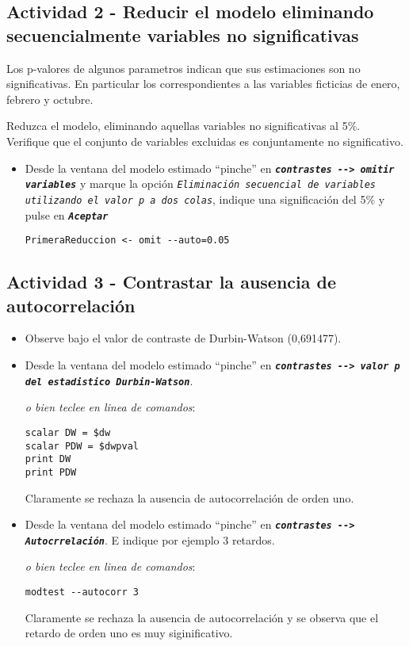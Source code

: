 \documentclass[11pt]{article}
\begin{document}
\subsection{Actividad 2 - Reducir el modelo eliminando secuencialmente variables no significativas}
\label{sec:org7359cb0}

Los p-valores de algunos parametros indican que sus estimaciones son
no significativas. En particular los correspondientes a las variables
ficticias de enero, febrero y octubre.

Reduzca el modelo, eliminando aquellas variables no significativas al
5\%. Verifique que el conjunto de variables excluidas es conjuntamente
no significativo.

\begin{itemize}
\item Desde la ventana del modelo estimado ``pinche'' en \textbf{\emph{\texttt{contrastes -{}-{}>
  omitir variables}}} y marque la opción \emph{\texttt{Eliminación secuencial de
  variables utilizando el valor p a dos colas}}, indique una
significación del 5\% y pulse en \textbf{\emph{\texttt{Aceptar}}}
{\vspace{0pt} \footnotesize \color{gray!70!black}
\begin{verbatim}
PrimeraReduccion <- omit --auto=0.05
\end{verbatim}
}
\end{itemize}


\subsection{Actividad 3 - Contrastar la ausencia de autocorrelación}
\label{sec:org2de6ca0}

\begin{itemize}
\item Observe bajo el valor de contraste de Durbin-Watson (0,691477).

\item Desde la ventana del modelo estimado ``pinche'' en \textbf{\emph{\texttt{contrastes -{}-{}>
  valor p del estadistico Durbin-Watson}}}. 
{\vspace{0pt} \footnotesize \color{gray!70!black}
\emph{o bien teclee en linea de comandos}:
\begin{verbatim}
scalar DW = $dw
scalar PDW = $dwpval
print DW
print PDW
\end{verbatim}
}

Claramente se rechaza la ausencia de autocorrelación de orden uno.

\item Desde la ventana del modelo estimado ``pinche'' en \textbf{\emph{\texttt{contrastes -{}-{}>
  Autocrrelación}}}. E indique por ejemplo 3 retardos. 
{\vspace{0pt} \footnotesize \color{gray!70!black}
\emph{o bien teclee en linea de comandos}:
\begin{verbatim}
modtest --autocorr 3
\end{verbatim}
}

Claramente se rechaza la ausencia de autocorrelación y se observa
que el retardo de orden uno es muy siginificativo.
\end{itemize}
\end{document}
